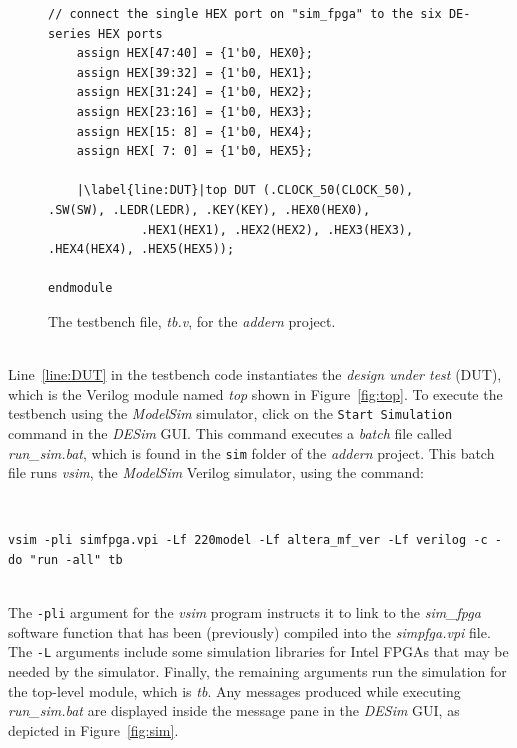 \documentclass[epsfig,10pt,fullpage]{article} \addtolength{\textwidth}{1.5in}
\begin{document}
\begin{figure}[H]
\begin{center}
\begin{minipage}[t]{15 cm}
\begin{lstlisting}[name=tb]
    // connect the single HEX port on "sim_fpga" to the six DE-series HEX ports
    assign HEX[47:40] = {1'b0, HEX0};
    assign HEX[39:32] = {1'b0, HEX1};
    assign HEX[31:24] = {1'b0, HEX2};
    assign HEX[23:16] = {1'b0, HEX3};
    assign HEX[15: 8] = {1'b0, HEX4};
    assign HEX[ 7: 0] = {1'b0, HEX5};
    
    |\label{line:DUT}|top DUT (.CLOCK_50(CLOCK_50), .SW(SW), .LEDR(LEDR), .KEY(KEY), .HEX0(HEX0), 
             .HEX1(HEX1), .HEX2(HEX2), .HEX3(HEX3), .HEX4(HEX4), .HEX5(HEX5));

endmodule
\end{lstlisting}
\end{minipage}
        \caption{The testbench file, {\it tb.v}, for the {\it addern} project.}
\label{fig:tb}
\end{center}
\end{figure}

~\\
\noindent
Line~\ref{line:DUT} in the testbench code instantiates the 
{\it design under test} (DUT), which is the Verilog module named {\it top} shown in 
Figure~\ref{fig:top}. To execute the testbench using the {\it ModelSim} simulator, click on the
\texttt{Start Simulation} command in the {\it DESim} GUI. This command executes a {\it batch} file 
called {\it run\_sim.bat}, which is found in the \texttt{sim} folder of the 
{\it addern} project. This batch file runs {\it vsim}, the {\it ModelSim} Verilog
simulator, using the command:

~\\
\begin{minipage}[h]{17.5 cm}
\lstset{language=Verilog,numbers=none,escapechar=|}
\begin{lstlisting}[]
vsim -pli simfpga.vpi -Lf 220model -Lf altera_mf_ver -Lf verilog -c -do "run -all" tb
\end{lstlisting}
\end{minipage}

~\\
\noindent
The \texttt{-pli} argument for the {\it vsim} program instructs it to link to the
{\it sim\_fpga} software function that has been (previously) compiled into the 
{\it simpfga.vpi} file. The \texttt{-L} arguments include some simulation libraries for
Intel FPGAs that may be needed by the simulator. Finally, the remaining arguments 
run the simulation for the top-level module, which is {\it tb}. Any messages 
produced while executing {\it run\_sim.bat} are displayed inside the message pane in
the {\it DESim} GUI, as depicted in Figure~\ref{fig:sim}.
\end{document}
